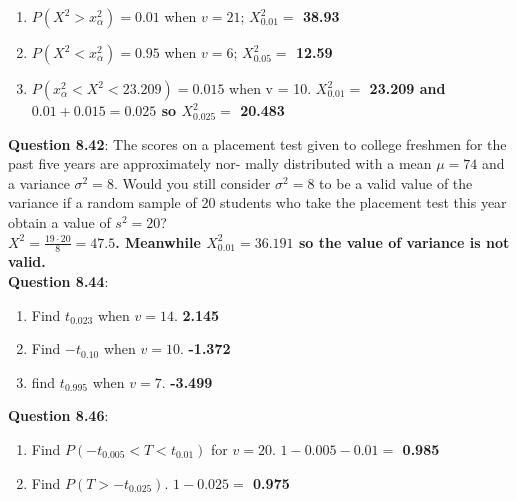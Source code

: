 \documentclass{article}
\begin{document}
        \begin{enumerate}[label = (\alph*) ]
            \item $P(X^2 > x^{2}_{\alpha}) = 0.01$ when $v = 21$;\newline
                \textbf{$X_{0.01}^{2} = $ 38.93}
            \item $P(X^2 < x^{2}_{\alpha}) = 0.95$ when $v = 6$;\newline
                \textbf{$X_{0.05}^{2} = $ 12.59}
            \item $P(x^{2}_{\alpha} < X^2 < 23.209) = 0.015$ when v = 10.\newline
                \textbf{$X_{0.01}^{2}= $ 23.209 and $0.01 + 0.015 = 0.025$ so $X_{0.025}^{2}= $ 20.483}
        \end{enumerate}
    \textbf{Question 8.42}: The scores on a placement test given to college
    freshmen for the past five years are approximately nor-
    mally distributed with a mean $\mu = 74$ and a variance
    $\sigma^2 = 8$. Would you still consider $\sigma^2 = 8$ to be a valid
    value of the variance if a random sample of 20 students
    who take the placement test this year obtain a value of
    $s^2 = 20$?\\\newline
        \textbf{$X^2 = \frac{19\cdot20}{8} = 47.5$. Meanwhile $X_{0.01}^{2} = 36.191$
        so the value of variance is not valid.}\\\newline
    \textbf{Question 8.44}:
        \begin{enumerate}[label = (\alph*) ]
            \item Find $t_{0.023}$ when $v = 14$.\newline
                \textbf{2.145}
            \item Find $-t_{0.10}$ when $v = 10$.\newline
                \textbf{-1.372}
            \item find $t_0.995$ when $v = 7$.\newline
                \textbf{-3.499}
        \end{enumerate}
    \textbf{Question 8.46}:
        \begin{enumerate}[label = (\alph*) ]
            \item Find $P(-t_{0.005} < T < t_{0.01})$ for $v = 20$.\newline
                \textbf{$1 - 0.005 - 0.01 =$ 0.985}
            \item Find $P(T > -t_{0.025})$.\newline
                \textbf{$1 - 0.025 = $ 0.975}
        \end{enumerate}
\end{document}
